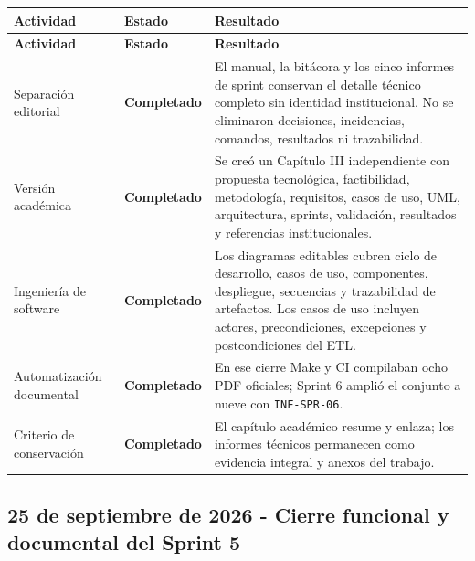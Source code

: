 \documentclass[11pt,letterpaper]{article}
\newcommand{\statusok}{\textcolor{deepgreen}{\textbf{Completado}}}
\newcommand{\file}[1]{\texttt{#1}}
\begin{document}
\begin{longtable}{@{}p{}p{}p{}@{}}
  \toprule
  \textbf{Actividad} & \textbf{Estado} & \textbf{Resultado} \\
  \midrule
  \endfirsthead
  \toprule
  \textbf{Actividad} & \textbf{Estado} & \textbf{Resultado} \\
  \midrule
  \endhead
  Separación editorial & \statusok & El manual, la bitácora y los cinco informes de sprint conservan el detalle técnico completo sin identidad institucional. No se eliminaron decisiones, incidencias, comandos, resultados ni trazabilidad. \\
  Versión académica & \statusok & Se creó un Capítulo III independiente con propuesta tecnológica, factibilidad, metodología, requisitos, casos de uso, UML, arquitectura, sprints, validación, resultados y referencias institucionales. \\
  Ingeniería de software & \statusok & Los diagramas editables cubren ciclo de desarrollo, casos de uso, componentes, despliegue, secuencias y trazabilidad de artefactos. Los casos de uso incluyen actores, precondiciones, excepciones y postcondiciones del ETL. \\
  Automatización documental & \statusok & En ese cierre Make y CI compilaban ocho PDF oficiales; Sprint 6 amplió el conjunto a nueve con \file{INF-SPR-06}. \\
  Criterio de conservación & \statusok & El capítulo académico resume y enlaza; los informes técnicos permanecen como evidencia integral y anexos del trabajo. \\
  \bottomrule
\end{longtable}

\subsection{25 de septiembre de 2026 - Cierre funcional y documental del Sprint 5}
\end{document}
